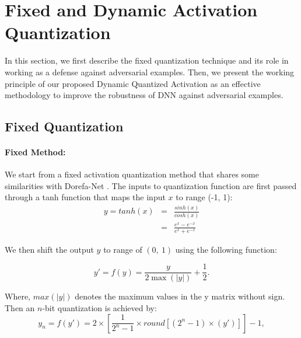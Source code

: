 \documentclass{article}
\begin{document}
\section{Fixed and Dynamic Activation Quantization}

In this section, we first describe the fixed quantization technique and its role in working as a defense against adversarial examples. Then, we present the working principle of our proposed Dynamic Quantized Activation as an effective methodology to improve the robustness of DNN against adversarial examples.  


\subsection{Fixed Quantization}

\paragraph{Fixed Method:}
We start from a fixed activation quantization method that shares some similarities with Dorefa-Net \cite{zhou2016dorefa}. %
The inputs to quantization function are first passed through a tanh function that maps the input $x$ to range (-1, 1):
\begin{eqnarray}
y=tanh(x)&=&\frac{sinh(x)}{cosh(x)}\\\nonumber
&=&\frac{e^x-e^{-x}}{e^x+e^{-x}}
\end{eqnarray}

\noindent We then shift the output $y$ to range of $(0,\ 1)$ using the following function:

\begin{equation}
\label{eq:f}
y'=f(y)={\frac{y}{2\max(|y|)}+\frac{1}{2}}.
\end{equation}

\noindent Where, $max(|y|)$ denotes the maximum values in the y matrix without sign. Then an $n$-bit quantization is achieved by:
\begin{equation}
\label{eq:2}
y_n=f(y')={2\times[\frac{1}{2^n-1}\times round[(2^n-1)\times(y')]]-1},
\end{equation}
\end{document}
